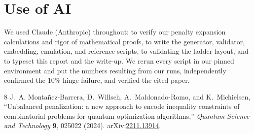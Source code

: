 \documentclass[10pt]{article}
\begin{document}
\section{Use of AI}
We used Claude (Anthropic) throughout: to verify our penalty expansion calculations and rigor of mathematical proofs, to write the generator, validator, embedding, emulation, and reference scripts, to validating the ladder layout, and to typeset this report and the write-up. We rerun every script in our pinned environment and put the numbers resulting from our runs, independently confirmed the 10\% hinge failure, and verified the cited paper.

\begin{thebibliography}{8}
J.~A. Monta\~nez-Barrera, D.~Willsch, A.~Maldonado-Romo, and K.~Michielsen,
``Unbalanced penalization: a new approach to encode inequality constraints of combinatorial problems
for quantum optimization algorithms,''
\emph{Quantum Science and Technology} \textbf{9}, 025022 (2024).
arXiv:\href{https://arxiv.org/abs/2211.13914}{2211.13914}.
\end{thebibliography}
\end{document}
